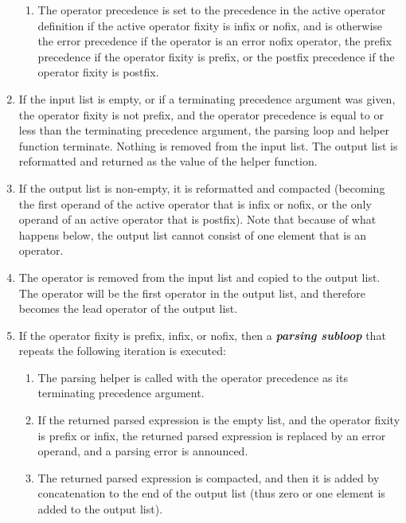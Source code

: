 \documentclass[12pt]{article}
\newcommand{\key}[1]{{\bf \em #1}\index{#1}}
\begin{document}
\begin{enumerate}
\begin{enumerate}
\item The operator precedence is set to the precedence
in the active operator definition if the active operator fixity
is infix or nofix,
and is otherwise the error precedence if the operator is an error
nofix operator, the prefix precedence if the operator fixity is
prefix, or the postfix precedence if the operator fixity is
postfix.

\end{enumerate}

\item If the input list is empty, or if
a terminating precedence argument was given, the operator fixity is
not prefix, and the operator precedence
is equal to or less than the terminating precedence argument,
the parsing loop and helper function terminate.
Nothing is removed from the input list.  The output list is reformatted
and returned as the value of the helper function.

\item If the output list is non-empty, it
is reformatted and compacted (becoming the
first operand of the active operator that is infix or nofix, or
the only operand of an active operator that is postfix).
Note that because of what happens below, the output list cannot
consist of one element that is an operator.

\item The operator is removed from the input list and copied
to the output list.  The operator will be the first
operator in the output list, and therefore
becomes the lead operator of the output list.

\item
If the operator fixity is prefix, infix, or nofix, then
a \key{parsing subloop} that repeats the following iteration is executed:

\begin{enumerate}

\item The parsing helper is called with
the operator precedence as its terminating precedence argument.

\item If the returned parsed expression is the empty list, and
the operator fixity is prefix or infix, the returned parsed expression is
replaced by an error operand, and a parsing error is announced.

\item The returned parsed expression is compacted, and then it
is added by concatenation to the end of the output list (thus
zero or one element is added to the output list).


\end{enumerate}
\end{enumerate}
\end{document}
